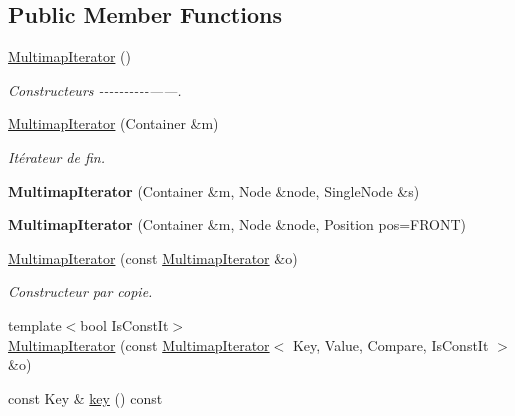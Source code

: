 \subsection*{Public Member Functions}
\begin{DoxyCompactItemize}
\item 
\hyperlink{classMultimapIterator_ac8fed38e75dedfa911756c5d619e9b4a}{Multimap\+Iterator} ()
\begin{DoxyCompactList}\small\item\em Constructeurs -\/-\/-\/-\/-\/-\/-\/-\/-\/-\/------. \end{DoxyCompactList}\item 
\mbox{\label{classMultimapIterator_a52231305c8f71648ce98993273899874}} 
\hyperlink{classMultimapIterator_a52231305c8f71648ce98993273899874}{Multimap\+Iterator} (Container \&m)
\begin{DoxyCompactList}\small\item\em Itérateur de fin. \end{DoxyCompactList}\item 
\mbox{\label{classMultimapIterator_a03504a7b1b57e6e5216b63561510d6fe}} 
{\bfseries Multimap\+Iterator} (Container \&m, Node \&node, Single\+Node \&s)
\item 
\mbox{\label{classMultimapIterator_a79df350144602525d2ecd5701a69c5be}} 
{\bfseries Multimap\+Iterator} (Container \&m, Node \&node, Position pos=F\+R\+O\+NT)
\item 
\mbox{\label{classMultimapIterator_addb81cae98d05bb35e628eaa0bccb539}} 
\hyperlink{classMultimapIterator_addb81cae98d05bb35e628eaa0bccb539}{Multimap\+Iterator} (const \hyperlink{classMultimapIterator}{Multimap\+Iterator} \&o)
\begin{DoxyCompactList}\small\item\em Constructeur par copie. \end{DoxyCompactList}\item 
{\footnotesize template$<$bool Is\+Const\+It$>$ }\\\hyperlink{classMultimapIterator_a97311a11001e54f21fd81c22f310eb3c}{Multimap\+Iterator} (const \hyperlink{classMultimapIterator}{Multimap\+Iterator}$<$ Key, Value, Compare, Is\+Const\+It $>$ \&o)
\item 
const Key \& \hyperlink{classMultimapIterator_a016fca3267d16d48b57964ee39d9efae}{key} () const

\end{DoxyCompactItemize}
